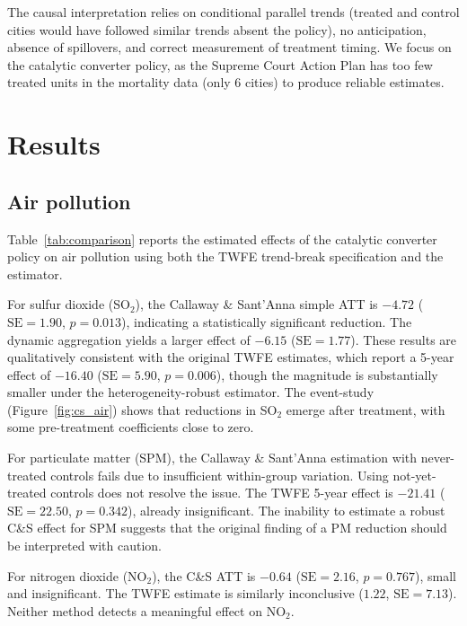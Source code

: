 \documentclass[10pt]{article}
\begin{document}
The causal interpretation relies on conditional parallel trends (treated and control cities would have followed similar trends absent the policy), no anticipation, absence of spillovers, and correct measurement of treatment timing. We focus on the catalytic converter policy, as the Supreme Court Action Plan has too few treated units in the mortality data (only 6 cities) to produce reliable estimates.

\section{Results}

\subsection{Air pollution}

Table~\ref{tab:comparison} reports the estimated effects of the catalytic converter policy on air pollution using both the TWFE trend-break specification and the \citet{callaway2021} estimator.

For sulfur dioxide (SO$_2$), the Callaway \& Sant'Anna simple ATT is $-4.72$ ($\text{SE} = 1.90$, $p = 0.013$), indicating a statistically significant reduction. The dynamic aggregation yields a larger effect of $-6.15$ ($\text{SE} = 1.77$). These results are qualitatively consistent with the original TWFE estimates, which report a 5-year effect of $-16.40$ ($\text{SE} = 5.90$, $p = 0.006$), though the magnitude is substantially smaller under the heterogeneity-robust estimator. The event-study (Figure~\ref{fig:cs_air}) shows that reductions in SO$_2$ emerge after treatment, with some pre-treatment coefficients close to zero.

For particulate matter (SPM), the Callaway \& Sant'Anna estimation with never-treated controls fails due to insufficient within-group variation. Using not-yet-treated controls does not resolve the issue. The TWFE 5-year effect is $-21.41$ ($\text{SE} = 22.50$, $p = 0.342$), already insignificant. The inability to estimate a robust C\&S effect for SPM suggests that the original finding of a PM reduction should be interpreted with caution.

For nitrogen dioxide (NO$_2$), the C\&S ATT is $-0.64$ ($\text{SE} = 2.16$, $p = 0.767$), small and insignificant. The TWFE estimate is similarly inconclusive ($1.22$, $\text{SE} = 7.13$). Neither method detects a meaningful effect on NO$_2$.
\end{document}

